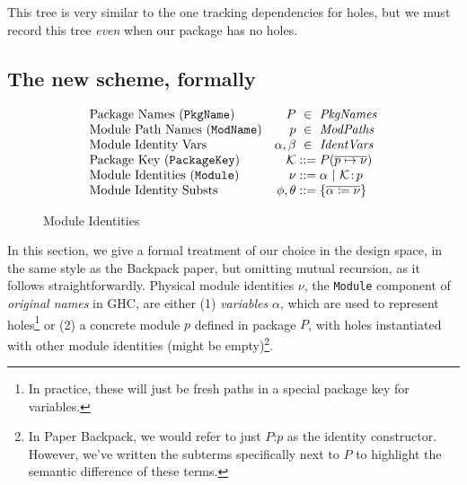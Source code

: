 \documentclass{article}
\begin{document}
This tree is very similar to the one tracking dependencies for holes,
but we must record this tree \emph{even} when our package has no holes.

\subsection{The new scheme, formally}

\begin{figure}
\begin{myfig}
\[
\begin{array}{@{}lr@{\;}c@{\;}l@{}}
    \text{Package Names (\texttt{PkgName})} & P &\in& \mathit{PkgNames} \\
    \text{Module Path Names (\texttt{ModName})} & p &\in& \mathit{ModPaths} \\
    \text{Module Identity Vars} & \alpha,\beta &\in& \mathit{IdentVars} \\
    \text{Package Key (\texttt{PackageKey})} & \K &::=& P(\vec{p\mapsto\nu}) \\
    \text{Module Identities (\texttt{Module})} & \nu &::=&
      \alpha ~|~
      \K\colon\! p \\
    \text{Module Identity Substs} & \phi,\theta &::=&
      \{\vec{\alpha \coloneqq \nu}\} \\
\end{array}
\]
\caption{Module Identities}
\label{fig:mod-idents}
\end{myfig}
\end{figure}

In this section, we give a formal treatment of our choice in the design space, in the
same style as the Backpack paper, but omitting mutual recursion, as it follows straightforwardly.
Physical module
identities $\nu$, the \texttt{Module} component of \emph{original names} in GHC, are either (1) \emph{variables} $\alpha$, which are
used to represent holes\footnote{In practice, these will just be fresh paths in a special package key for variables.} or (2) a concrete module $p$ defined in package
$P$, with holes instantiated with other module identities (might be
empty)\footnote{In Paper Backpack, we would refer to just $P$:$p$ as the identity
constructor.  However, we've written the subterms specifically next to $P$ to highlight the semantic difference of these terms.}.
\end{document}
